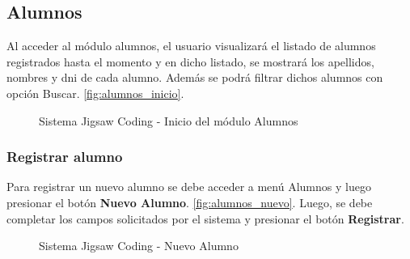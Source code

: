 \subsection{Alumnos}
Al acceder al módulo alumnos, el usuario visualizará el listado de alumnos registrados hasta el momento y en dicho listado, se mostrará los apellidos, nombres y dni de cada alumno. Además se podrá filtrar dichos alumnos con opción Buscar. \autoref{fig:alumnos_inicio}.

\begin{figure}[h!]
	\centering
	\caption[SJC Alumnos]{Sistema Jigsaw Coding - Inicio del módulo Alumnos}
	\label{fig:alumnos_inicio}
\end{figure}

\subsubsection{Registrar alumno}

Para registrar un nuevo alumno se debe acceder a menú Alumnos y luego presionar el botón \textbf{Nuevo Alumno}. \autoref{fig:alumnos_nuevo}. Luego, se debe completar los campos solicitados por el sistema y presionar el botón \textbf{Registrar}.

\begin{figure}[h!]
	\centering
	\caption[SJC Nuevo alumno]{Sistema Jigsaw Coding - Nuevo Alumno}
	\label{fig:alumnos_nuevo}
\end{figure}

